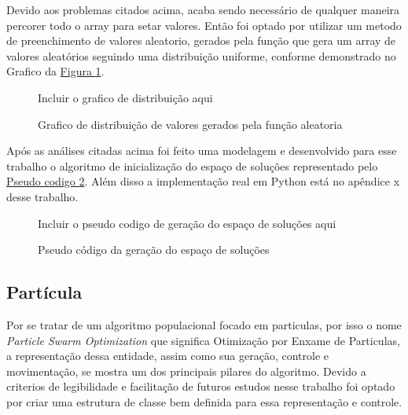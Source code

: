                 \noindent Devido aos problemas citados acima, acaba sendo necessário de qualquer maneira percorer todo o array para setar valores. \newline 
                Então foi optado por utilizar um metodo de preenchimento de valores aleatorio, 
                gerados pela função  que gera um array de valores aleatórios seguindo uma distribuição uniforme, 
                conforme demonstrado no Grafico da \hyperref[fig:distrib-uniforme]{Figura \ref{fig:distrib-uniforme}}.

                \begin{figure}[h]
                    \centering
                    \small{Incluir o grafico de distribuição aqui}
                    \caption{Grafico de distribuição de valores gerados pela função aleatoria}
                    \label{fig:distrib-uniforme}
                \end{figure}
                

            Após as análises citadas acima foi feito uma modelagem e desenvolvido para esse trabalho o algoritmo de inicialização do espaço de soluções representado pelo 
            \hyperref[fig:pseudocodigo-solutionspace]{Pseudo codigo \ref{fig:pseudocodigo-solutionspace}}. 
            Além disso a implementação real em Python está no apêndice x desse trabalho.\hfill

            \begin{figure}[h]
                \centering
                \small{Incluir o pseudo codigo de geração do espaço de soluções aqui}
                \caption{Pseudo código da geração do espaço de soluções}
                \label{fig:pseudocodigo-solutionspace}
            \end{figure}
        


    \subsection{Partícula}
            Por se tratar de um algoritmo populacional focado em particulas, por isso o nome \textit{Particle Swarm Optimization} que significa Otimização por Enxame de Particulas, a representação dessa entidade, assim como sua geração, controle e movimentação, se mostra um dos principais pilares do algoritmo. Devido a criterios de legibilidade e facilitação de futuros estudos nesse trabalho foi optado por criar uma estrutura de classe bem definida para essa representação e controle.
        


